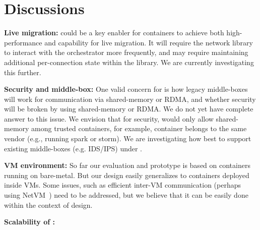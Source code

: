 \section{Discussions} \label{sec:discussion}

\textbf{Live migration:} 
\sysname could be a key enabler
for containers to achieve both high-performance and capability for live
migration. It will require the network library to interact with the orchestrator
more frequently, and may require maintaining additional per-connection state
within the library. We are currently investigating this further.

\textbf{Security and middle-box:} One valid concern for \sysname is how legacy
middle-boxes will work for communication via shared-memory or RDMA, and whether
security will be broken by using shared-memory or RDMA.  We do not yet have
complete answer to this issue. We envision that for security, \sysname would
only allow shared-memory among trusted containers, for example, container
belongs to the same vendor (e.g., running spark or storm).  We are investigating
how best to support existing middle-boxes (e.g. IDS/IPS) under \sysname.


\textbf{VM environment:}
So far our evaluation and prototype is based on containers running on
bare-metal.  But our design easily generalizes to containers deployed inside
VMs. Some issues, such as efficient inter-VM communication (perhaps using
NetVM~\cite{netvm}) need to be addressed, but we believe that it can be easily
done within the context of \sysname design.


\textbf{Scalability of \sysname :}


